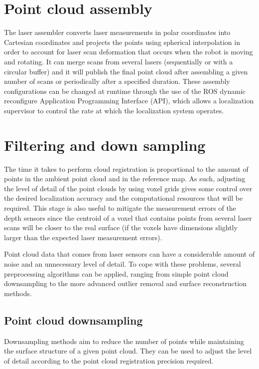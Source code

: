 \section{Point cloud assembly}

The laser assembler converts laser measurements in polar coordinates into Cartesian coordinates and projects the points using spherical interpolation in order to account for laser scan deformation that occurs when the robot is moving and rotating. It can merge scans from several lasers (sequentially or with a circular buffer) and it will publish the final point cloud after assembling a given number of scans or periodically after a specified duration. These assembly configurations can be changed at runtime through the use of the ROS dynamic reconfigure Application Programming Interface (API), which allows a localization supervisor to control the rate at which the localization system operates.



\section{Filtering and down sampling}

The time it takes to perform cloud registration is proportional to the amount of points in the ambient point cloud and in the reference map. As such, adjusting the level of detail of the point clouds by using voxel grids gives some control over the desired localization accuracy and the computational resources that will be required. This stage is also useful to mitigate the measurement errors of the depth sensors since the centroid of a voxel that contains points from several laser scans will be closer to the real surface (if the voxels have dimensions slightly larger than the expected laser measurement errors).

Point cloud data that comes from laser sensors can have a considerable amount of noise and an unnecessary level of detail. To cope with these problems, several preprocessing algorithms can be applied, ranging from simple point cloud downsampling to the more advanced outlier removal and surface reconstruction methods.


\subsection{Point cloud downsampling}

Downsampling methods aim to reduce the number of points while maintaining the surface structure of a given point cloud. They can be used to adjust the level of detail according to the point cloud registration precision required.


